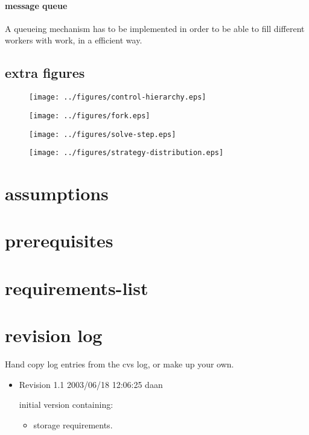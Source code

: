 \documentclass[]{lofar}
\begin{document}
    \paragraph{message queue}
      A queueing mechanism has to be implemented in order to be able
      to fill different workers with work, in a efficient way.

    \subsection{extra figures}
    \begin{figure}
      \texttt{[image: ../figures/control-hierarchy.eps]}
    \end{figure}

    \begin{figure}
      \texttt{[image: ../figures/fork.eps]}
    \end{figure}

    \begin{figure}
      \texttt{[image: ../figures/solve-step.eps]}
    \end{figure}

    \begin{figure}
      \texttt{[image: ../figures/strategy-distribution.eps]}
    \end{figure}

\newcommand{\dbappendix}[1]{\section{#1}}%

\appendix

  \dbappendix{assumptions}
  \label{app:assumptions}\hypertarget{app:assumptions}{}


  \dbappendix{prerequisites}
  \label{app:prerequisites}\hypertarget{app:prerequisites}{}


  \dbappendix{requirements-list}
  \label{app:requirements-list}\hypertarget{app:requirements-list}{}%


  \printindex

  \dbappendix{revision log}
  \label{app:revision-log}\hypertarget{app:revision-log}{}%

    Hand copy log entries from the cvs log, or make up your own.

    \begin{itemize}

      \item 

        Revision 1.1 2003/06/18 12:06:25 daan

        initial version containing:
        \begin{itemize}

	  \item 

            storage requirements.

        \end{itemize}

    \end{itemize}
\end{document}
